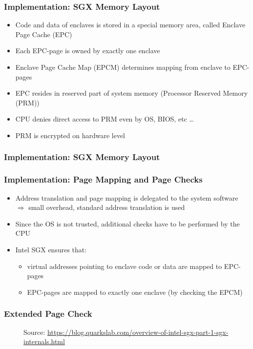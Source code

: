 \begin{frame}
    \frametitle{Implementation: SGX Memory Layout}
    \begin{itemize}[<+->]
        \item Code and data of enclaves is stored in a special memory area, called Enclave Page Cache (EPC)
        \item Each EPC-page is owned by exactly one enclave
        \item Enclave Page Cache Map (EPCM) determines mapping from enclave to EPC-pages
        \item EPC resides in reserved part of system memory (Processor Reserved Memory (PRM))
        \item CPU denies direct access to PRM even by OS, BIOS, etc \dots
        \item PRM is encrypted on hardware level
    \end{itemize}
\end{frame}

\begin{frame}
    \frametitle{Implementation: SGX Memory Layout}
    \centering
\end{frame}

\begin{frame}
    \frametitle{Implementation: Page Mapping and Page Checks}
    \begin{itemize}[<+->]
        \item Address translation and page mapping is delegated to the system software \newline
              $\Rightarrow$ small overhead, standard address translation is used
        \item Since the OS is not trusted, additional checks have to be performed by the CPU
        \item Intel SGX ensures that: 
            \begin{itemize}
                \item virtual addresses pointing to enclave code or data are mapped to EPC-pages
                \item EPC-pages are mapped to exactly one enclave (by checking the EPCM)
            \end{itemize}
    \end{itemize}
\end{frame}

\begin{frame}
    \frametitle{Extended Page Check}
    \begin{figure}
        \centering
        \caption*{Source: \url{https://blog.quarkslab.com/overview-of-intel-sgx-part-1-sgx-internals.html}}
    \end{figure}
\end{frame}

